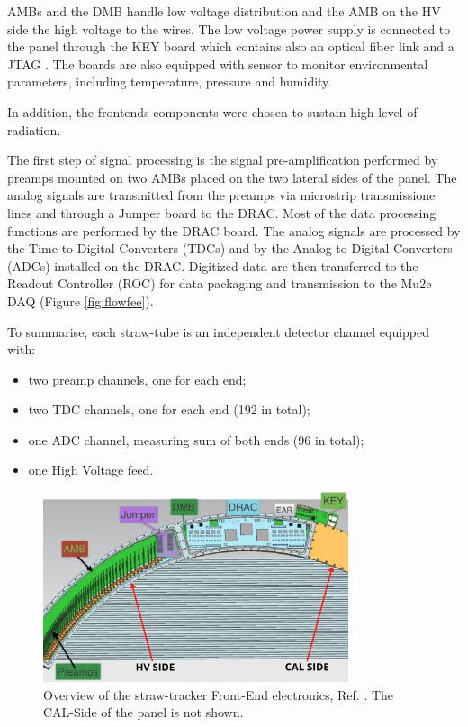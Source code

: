  AMBs and the DMB  handle 
low voltage distribution and the AMB on the HV side  the high voltage to the  wires.
The low voltage power supply is connected to the panel through the KEY board which 
contains also an optical fiber link and a JTAG .
The  boards are also equipped with sensor to monitor environmental parameters, 
including temperature, pressure and humidity.

In addition, the frontends components were chosen to sustain high level of radiation.

The first step of signal processing is the signal pre-amplification performed 
by preamps mounted on two AMBs placed on the two lateral sides of the panel. 
The analog signals are transmitted from the preamps via 
microstrip transmissione lines and through a Jumper board to the DRAC.
Most of the data processing functions are performed by the DRAC board. 
The analog signals are processed by the Time-to-Digital Converters 
(TDCs) and by the Analog-to-Digital Converters 
(ADCs) installed on the DRAC. Digitized data are then transferred to the Readout 
Controller (ROC) for data packaging and transmission to the Mu2e DAQ 
(Figure \ref{fig:flowfee}). 

To summarise, each straw-tube is an independent detector channel equipped with:
\begin{itemize}
    \item two preamp channels, one for each end;
    \item two TDC channels, one for each end (192 in total);
    \item one ADC channel, measuring sum of both ends (96 in total);
    \item one High Voltage feed.
\end{itemize}
\begin{figure}[!h]
\centering
\includegraphics[width =0.8\textwidth]{figures/png/Screenshot_20240131_111836.png}
\caption[Overview of the straw-tracker Front-End electronics.]{Overview of the straw-tracker Front-End electronics, Ref.  
\cite{vadimmu2e}. The CAL-Side of the panel is not shown.}
\label{fig:trackerfee}
\end{figure}


